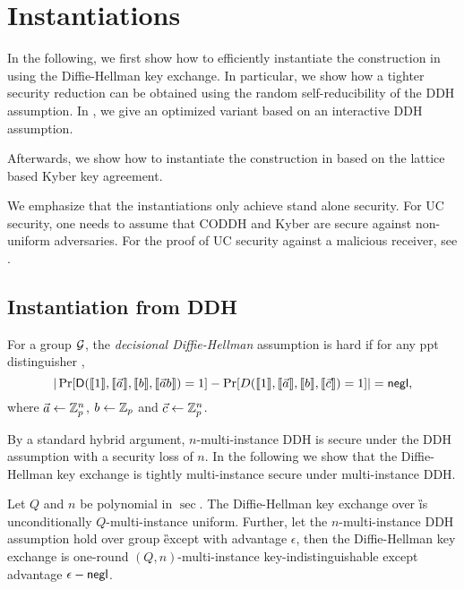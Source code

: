 \section{Instantiations}\label{sec:inst}
In the following, we first show how to efficiently instantiate the construction in  using the Diffie-Hellman key exchange. In particular, we show how a tighter security reduction can be obtained using the random self-reducibility of the DDH assumption. In , we give an optimized variant based on an interactive DDH assumption.

Afterwards, we show how to instantiate the construction in  based on the lattice based Kyber key agreement. 

We emphasize that the instantiations only achieve stand alone security. For UC security, one needs to assume that CODDH and Kyber are secure against non-uniform adversaries. For the proof of UC security against a malicious receiver, see .


\subsection{Instantiation from DDH}



\begin{definition}
For a group $\mathcal{G}$, the \emph{decisional Diffie-Hellman} assumption is hard if for any ppt distinguisher \D,
$$
|\Pr[ \mathsf D(\llbracket 1\rrbracket,\llbracket \vec{a}\rrbracket,\llbracket b\rrbracket,\llbracket \vec{a}b\rrbracket)=1]-\Pr[ D(\llbracket 1\rrbracket,\llbracket \vec{a}\rrbracket,\llbracket b\rrbracket,\llbracket \vec{c}\rrbracket)=1]|=\mathsf{negl},
$$
where $\vec{a}\leftarrow\mathbb Z_p^n$, $b\leftarrow\mathbb Z_p$ and $\vec{c}\leftarrow\mathbb Z_p^n$.
\end{definition}


By a standard hybrid argument, $n$-multi-instance DDH is secure under the DDH assumption with a security loss of $n$. In the following we show that the Diffie-Hellman key exchange is tightly multi-instance secure under multi-instance DDH. 

\begin{lemma}\label{lem:DDH}
Let $Q$ and $n$ be polynomial in $\sec$.
The Diffie-Hellman key exchange over \G is unconditionally $Q$-multi-instance uniform. Further, let the $n$-multi-instance DDH assumption hold over group \G except with advantage $\epsilon$, then the Diffie-Hellman key exchange is one-round $(Q,n)$-multi-instance key-indistinguishable except advantage $\epsilon-\mathsf{negl}$. 
\end{lemma}

